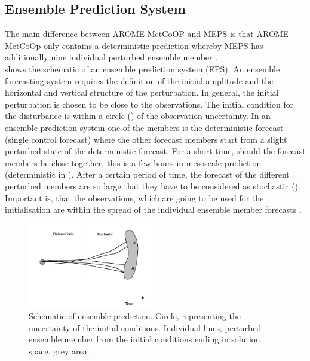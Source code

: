 \subsection{Ensemble Prediction System}
The main difference between AROME-MetCoOP and MEPS is that AROME-MetCoOp only contains a deterministic prediction whereby MEPS has additionally nine individual perturbed ensemble member \citep{metcoop_wiki_description_2017}. 
\\
 shows the schematic of an ensemble prediction system (EPS). An ensemble forecasting system requires the definition of the initial amplitude and the horizontal and vertical structure of the perturbation. In general, the initial perturbation is chosen to be close to the observations. The initial condition for the disturbance is within a circle () of the observation uncertainty. In an ensemble prediction system one of the members is the deterministic forecast (single control forecast) where the other forecast members start from a slight perturbed state of the deterministic forecast. For a short time, should the forecast members be close together, this is a few hours in mesoscale prediction (deterministic in ). After a certain period of time, the forecast of the different perturbed members are so large that they have to be considered as stochastic (). 
\\
Important is, that the observations, which are going to be used for the initialisation are within the spread of the individual ensemble member forecasts \citep{kalnay_atmospheric_2003}.
\begin{figure}[t!]
	\centering
	\includegraphics[width=0.49\textwidth]{./fig_MEPS/ensemble}
	\caption{Schematic of ensemble prediction. Circle, representing the uncertainty of the initial conditions. Individual lines, perturbed ensemble member from the initial conditions ending in solution space, grey area \citep{kalnay_atmospheric_2003}.}\label{fig:MEPS:kalnay_ens}
\end{figure}


